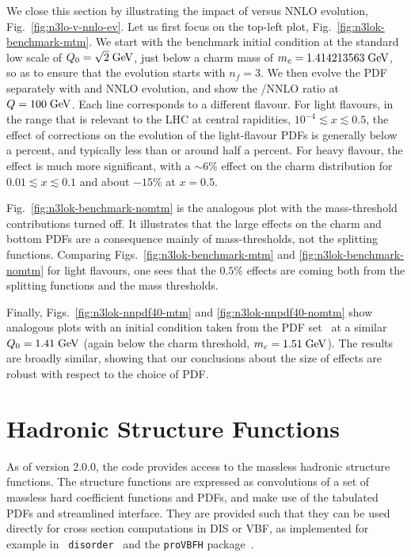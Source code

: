 We close this section by illustrating the impact of \ntlo versus NNLO
evolution, Fig.~\ref{fig:n3lo-v-nnlo-ev}.
%
Let us first focus on the top-left plot,
Fig.~\ref{fig:n3lok-benchmark-mtm}.
%
We start with the benchmark initial condition at the standard low
scale of $Q_0 = \sqrt{2}\;\mathrm{GeV}$, just below a charm mass of $m_c =
1.414213563 \;\mathrm{GeV}$, so as to ensure that the evolution starts with $n_f
= 3$.
%
We then evolve the PDF separately with \ntlo and NNLO evolution, and
show the \ntlo/NNLO ratio at $Q = 100\;\mathrm{GeV}$.
%
Each line corresponds to a different flavour.
%
For light flavours, in the range that is relevant to the LHC at
central rapidities, $10^{-4} \lesssim x \lesssim 0.5$, the effect of
\ntlo corrections on the evolution of the light-flavour PDFs is
generally below a percent, and typically less than or around half a
percent.
%
For heavy flavour, the effect is much more significant, with a
$\sim 6\%$ effect on the charm distribution for $0.01 \lesssim x
\lesssim 0.1$ and about $-15\%$ at $x=0.5$.

Fig.~\ref{fig:n3lok-benchmark-nomtm} is the analogous plot with the
\ntlo mass-threshold contributions turned off.
%
It illustrates that the large effects on the charm and bottom PDFs are
a consequence mainly of \ntlo mass-thresholds, not the \ntlo splitting functions.
%
Comparing Figs.~\ref{fig:n3lok-benchmark-mtm} and
\ref{fig:n3lok-benchmark-nomtm} for light flavours, one sees that the $0.5\%$
effects are coming both from the \ntlo splitting functions and the
\ntlo mass thresholds.

Finally, Figs.~\ref{fig:n3lok-nnpdf40-mtm} and
\ref{fig:n3lok-nnpdf40-nomtm} show analogous plots with an initial
condition taken from the  PDF
set~\cite{NNPDF:2021njg} at a similar $Q_0 = 1.41 \;\mathrm{GeV}$ (again below
the charm threshold, $m_c = 1.51\;\mathrm{GeV}$).
%
The results are broadly similar, showing that our conclusions about the
size of \ntlo effects are robust with respect to the choice of PDF.



\section{Hadronic Structure Functions}
\label{sec:structure-funcs}
As of \hoppet version 2.0.0, the code provides access to the massless
hadronic structure functions. The structure functions are expressed as
convolutions of a set of massless hard coefficient functions and PDFs,
and make use of the tabulated PDFs and streamlined interface.  They
are provided such that they can be used directly for cross section
computations in DIS or VBF, as implemented for example in {\tt
  disorder}~\cite{Karlberg:2024hnl} and the {\tt proVBFH}
package~\cite{Cacciari:2015jma,Dreyer:2016oyx,Dreyer:2018qbw,Dreyer:2018rfu,Dreyer:2020urf,Dreyer:2020xaj}.

